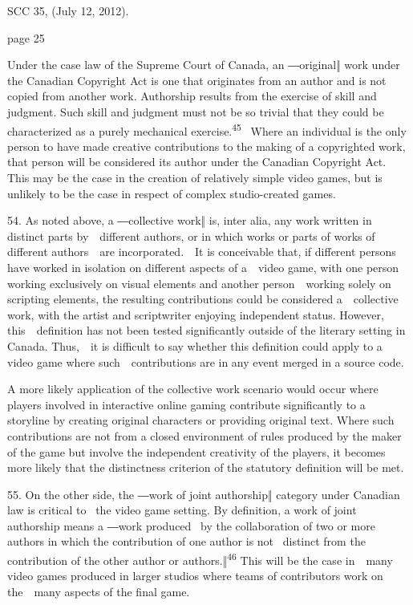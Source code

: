\documentclass[
]{article}
\begin{document}
{SCC 35, (July 12, 2012).}

{page 25}

{Under the case law of the Supreme Court of Canada, an ―original‖ work
under the }{Canadian }{Copyright Act }{is one that originates from an
author and is not copied from another work. Authorship results from the
exercise of skill and judgment. Such skill and judgment must not be so
trivial that they could be characterized as a purely mechanical
exercise.}\textsuperscript{{45~~}}{Where an individual is the only
person to have made creative contributions to the making of a
copyrighted work, that person will be considered its author under the
Canadian }{Copyright Act}{. This may be the case in the creation of
relatively simple video games, but is unlikely to be the case in respect
of complex studio-created games.}

{54. }{As noted above, a ―collective work‖ is, }{inter alia}{, any work
written in distinct parts by~~different authors, or in which works or
parts of works of different authors~~are incorporated.~~It is
conceivable that, if different persons have worked in isolation on
different aspects of a~~video game, with one person working exclusively
on visual elements and another person~~working solely on scripting
elements, the resulting contributions could be considered a~~collective
work, with the artist and scriptwriter enjoying independent status.
However, this~~definition has not been tested significantly outside of
the literary setting in Canada. Thus,~~it is difficult to say whether
this definition could apply to a video game where such~~contributions
are in any event merged in a source code.}

{A more likely application of the collective work scenario would occur
where players involved in interactive online gaming contribute
significantly to a storyline by creating original characters or
providing original text. Where such contributions are not from a closed
environment of rules produced by the maker of the game but involve the
independent creativity of the players, it becomes more likely that the
distinctness criterion of the statutory definition will be met.}

{55. }{On the other side, the ―work of joint authorship‖ category under
Canadian law is critical to }{~the video game setting. By definition, a
work of joint authorship means a }{―work produced }{~by the
collaboration of two or more authors in which the contribution of one
author is not }{~distinct from the contribution of the other author or
authors.‖}\textsuperscript{{46 }}{This will be the case in~~many video
games produced in larger studios where teams of contributors work on
the~~many aspects of the final game.}
\end{document}
